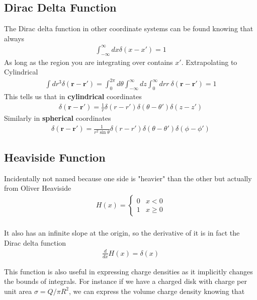 \subsection{Dirac Delta Function}
The Dirac delta function in other coordinate systems can be found knowing that always
\begin{align}
\int_{-\infty}^\infty dx \delta(x-x') = 1
\end{align}
As long as the region you are integrating over contains $x'$. Extrapolating to Cylindrical
\begin{align}
\int dr^3 \delta(\textbf{r}-\textbf{r}') = \int_0^{2\pi} d\theta \int_{-\infty}^\infty dz \int_0^\infty dr r ~\delta(\textbf{r}-\textbf{r}') = 1
\end{align}
This tells us that in \textbf{cylindrical} coordinates
\begin{align}
\delta(\textbf{r}-\textbf{r}') = \frac{1}{r}\delta(r-r')\delta(\theta-\theta')\delta(z-z')
\end{align}
Similarly in \textbf{spherical} coordinates
\begin{align}
\delta(\textbf{r}-\textbf{r}') = \frac{1}{r^2\sin\theta}\delta(r-r')\delta(\theta-\theta')\delta(\phi-\phi')
\end{align}





\subsection{Heaviside Function}
Incidentally not named because one side is "heavier" than the other but actually from Oliver Heaviside
\begin{align}
H(x) =
\begin{cases}
0 & x < 0\\
1 & x\ge 0
\end{cases}\\
\end{align}

It also has an infinite slope at the origin, so the derivative of it is in fact the Dirac delta function
\begin{align}
\frac{d}{dx} H(x) = \delta(x)
\end{align}


This function is also useful in expressing charge densities as it implicitly changes the bounds of integrals. For instance if we have a charged disk with charge per unit area $\sigma = Q/\pi R^2$, we can express the volume charge density knowing that

